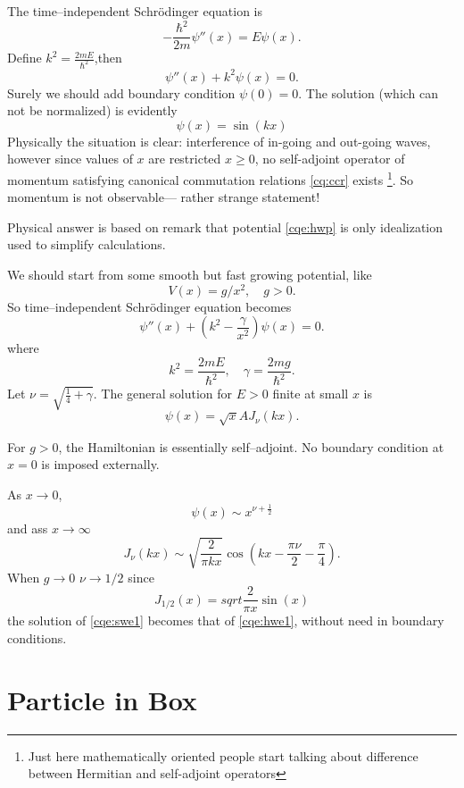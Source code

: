 The time–independent Schrödinger equation is
\[
-\frac{\hbar^2}{2m}\psi''(x)
= E\psi(x).
\]
Define $ k^2=\frac{2mE}{\hbar^2} $,then
\begin{equation}
    \label{cqe:hwe1}
\psi''(x)+k^2 \psi(x)=0.
\end{equation}
Surely we should add boundary condition $ \psi(0)=0 $.
The solution (which can not be normalized) is evidently 
\begin{equation}
   \label {cqe:hws1}
    \psi(x)=\sin(k x)
\end{equation}
Physically the situation is clear: interference of in-going and out-going waves, 
however since values of $x$ are restricted $ x \ge 0 $,
no self-adjoint operator of momentum satisfying canonical commutation
relations \eqref{cq:ccr} exists \footnote{ Just here mathematically oriented 
people start talking about difference between Hermitian and 
self-adjoint operators}. So momentum is not observable--- rather 
strange statement!

Physical answer is based on remark that potential \eqref{cqe:hwp} 
is only idealization used to simplify calculations.

We should start from some smooth but fast growing potential,
like
\begin{equation}
   \label {cqe:swp}
   V(x)=g/x^2,\quad g>0.
\end{equation}
So time–independent Schrödinger equation becomes
\begin{equation}
    \label{cqe:swe1}
\psi''(x)+\left(k^2-\frac{\gamma}{x^2}\right)\psi(x)=0.
\end{equation}
where 
\[
k^2=\frac{2mE}{\hbar^2},
\quad
\gamma=\frac{2mg}{\hbar^2}.
\]
Let $\nu=\sqrt{\frac{1}{4}+\gamma}$.
The general solution for $E>0$ finite at small $x$ is 
\begin{equation}
    \label{cqe:sws}
\psi(x)=\sqrt{x}A J_\nu(kx).
\end{equation}
\begin{remark}
For $g>0$, the Hamiltonian is essentially self–adjoint.
No boundary condition at $x=0$ is imposed externally.
\end{remark}
As $x\to 0$,
\[\psi(x)\sim x^{\nu+\frac{1}{2}}\]
and ass $x \to \infty$
\[
J_\nu(kx)
\sim
\sqrt{\frac{2}{\pi kx}}
\cos\left(
kx-\frac{\pi\nu}{2}-\frac{\pi}{4}
\right).
\]
When $g \to 0$ $\nu \to 1/2$ since
\[J_{1/2}(x)=sqrt{\frac{2}{\pi x}} \sin(x)\]
the solution of \eqref{cqe:swe1} becomes that of \eqref{cqe:hwe1},
without need in boundary conditions.

\section{Particle in Box}

